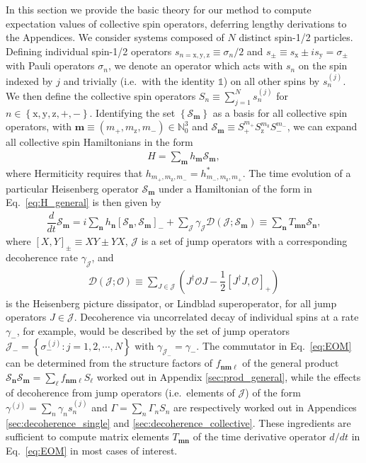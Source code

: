 \documentclass[aps,11pt,notitlepage,nofootinbib,longbibliography]{revtex4-1}
\newcommand{\f}[2]{\dfrac{#1}{#2}} %
\newcommand{\p}[1]{\left(#1\right)} %
\renewcommand{\sp}[1]{\left[#1\right]} %
\renewcommand{\set}[1]{\left\{#1\right\}} %
\renewcommand{\v}{\bm} %
\newcommand{\D}{\mathcal{D}}
\newcommand{\J}{\mathcal{J}}
\renewcommand{\O}{\mathcal{O}}
\renewcommand{\S}{\mathcal{S}}
\newcommand{\N}{\mathbb{N}}
\newcommand{\z}{\text{z}}
\newcommand{\x}{\text{x}}
\newcommand{\y}{\text{y}}
\newcommand{\1}{\mathds{1}}
\begin{document}
In this section we provide the basic theory for our method to compute
expectation values of collective spin operators, deferring lengthy
derivations to the Appendices.  We consider systems composed of $N$
distinct spin-1/2 particles.  Defining individual spin-1/2 operators
$s_{n=\x,\y,\z}\equiv\sigma_n/2$ and
$s_\pm\equiv s_\x\pm is_\y=\sigma_\pm$ with Pauli operators
$\sigma_n$, we denote an operator which acts with $s_n$ on the spin
indexed by $j$ and trivially (i.e.~with the identity $\1$) on all
other spins by $s_n^{(j)}$.  We then define the collective spin
operators $S_n\equiv\sum_{j=1}^Ns_n^{(j)}$ for
$n\in\set{\x,\y,\z,+,-}$.  Identifying the set $\set{\S_{\v m}}$ as a
basis for all collective spin operators, with
$\v m\equiv\p{m_+,m_\z,m_-}\in\N_0^3$ and
$\S_{\v m}\equiv S_+^{m_+} S_\z^{m_\z} S_-^{m_-}$, we can expand all
collective spin Hamiltonians in the form
\begin{align}
  H = \sum_{\v m} h_{\v m} \S_{\v m},
  \label{eq:H_general}
\end{align}
where Hermiticity requires that $h_{m_+,m_\z,m_-}=h_{m_-,m_\z,m_+}^*$.
The time evolution of a particular Heisenberg operator $\S_{\v m}$
under a Hamiltonian of the form in Eq.~\eqref{eq:H_general} is then
given by
\begin{align}
  \f{d}{dt}\S_{\v m}
  = i\sum_{\v n}h_{\v n}\sp{\S_{\v n},\S_{\v m}}_-
  + \sum_\J \gamma_\J \D\p{\J;\S_{\v m}}
  \equiv \sum_{\v n} T_{\v m\v n} \S_{\v n},
  \label{eq:EOM}
\end{align}
where $\sp{X,Y}_\pm\equiv XY\pm YX$, $\J$ is a set of jump operators
with a corresponding decoherence rate $\gamma_\J$, and
\begin{align}
  \D\p{\J;\O}
  \equiv \sum_{J\in\J} \p{J^\dag \O J - \f12\sp{J^\dag J,\O}_+}
\end{align}
is the Heisenberg picture dissipator, or Lindblad superoperator, for
all jump operators $J\in\J$.  Decoherence via uncorrelated decay of
individual spins at a rate $\gamma_-$, for example, would be described
by the set of jump operators
$\J_-=\set{\sigma_-^{(j)}:j=1,2,\cdots,N}$ with
$\gamma_{\J_-}=\gamma_-$.  The commutator in Eq.~\eqref{eq:EOM} can be
determined from the structure factors of $f_{\v n\v m\v\ell}$ of the
general product
$\S_{\v n}\S_{\v m}=\sum_{\v\ell}f_{\v n\v m\v\ell}S_{\v\ell}$ worked
out in Appendix \ref{sec:prod_general}, while the effects of
decoherence from jump operators (i.e.~elements of $\J$) of the form
$\gamma^{(j)}=\sum_n\gamma_ns_n^{(j)}$ and $\Gamma=\sum_n\Gamma_nS_n$
are respectively worked out in Appendices \ref{sec:decoherence_single}
and \ref{sec:decoherence_collective}.  These ingredients are
sufficient to compute matrix elements $T_{\v m\v n}$ of the time
derivative operator $d/dt$ in Eq.~\eqref{eq:EOM} in most cases of
interest.
\end{document}
